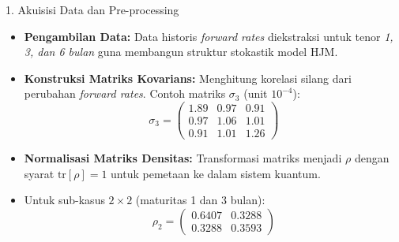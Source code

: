 \begin{frame}{1. Akuisisi Data dan Pre-processing}
    \begin{itemize}
        \item \textbf{Pengambilan Data:} Data historis \textit{forward rates} diekstraksi untuk tenor \textit{1, 3, dan 6 bulan} guna membangun struktur stokastik model HJM.
        \item \textbf{Konstruksi Matriks Kovarians:} Menghitung korelasi silang dari perubahan \textit{forward rates}. Contoh matriks $\sigma_3$ (unit $10^{-4}$):
        \begin{equation}
            \sigma_3 = \begin{pmatrix} 1.89 & 0.97 & 0.91 \\ 0.97 & 1.06 & 1.01 \\ 0.91 & 1.01 & 1.26 \end{pmatrix}
        \end{equation}
        \item \textbf{Normalisasi Matriks Densitas:} Transformasi matriks menjadi $\rho$ dengan syarat $\text{tr}[\rho] = 1$ untuk pemetaan ke dalam sistem kuantum.
        \item Untuk sub-kasus $2 \times 2$ (maturitas 1 dan 3 bulan):
        \begin{equation}
            \rho_2 = \begin{pmatrix} 0.6407 & 0.3288 \\ 0.3288 & 0.3593 \end{pmatrix}
        \end{equation}
    \end{itemize}
\end{frame}
